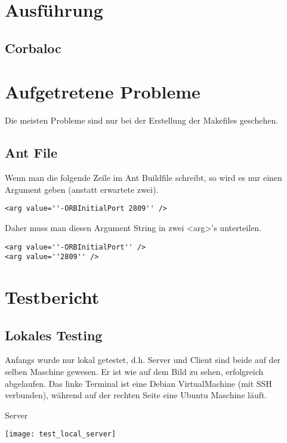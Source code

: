 \documentclass[11pt]{article}
\begin{document}
\section{Ausführung}


\subsection{Corbaloc}
\cite{book1}

\section{Aufgetretene Probleme}
Die meisten Probleme sind nur bei der Erstellung der Makefiles geschehen.
\subsection{Ant File}

Wenn man die folgende Zeile im Ant Buildfile schreibt, so wird es nur einen Argument geben (anstatt erwartete zwei).
\begin{lstlisting}
<arg value=''-ORBInitialPort 2809'' />
\end{lstlisting}

Daher muss man diesen Argument String in zwei <arg>'s unterteilen.
\begin{lstlisting}
<arg value=''-ORBInitialPort'' />
<arg value=''2809'' />
\end{lstlisting}

\section{Testbericht}

\subsection{Lokales Testing}

Anfangs wurde nur lokal getestet, d.h. Server und Client sind beide auf der selben Maschine gewesen. Er ist wie auf dem Bild zu sehen, erfolgreich abgelaufen. Das linke Terminal ist eine Debian VirtualMachine (mit SSH verbunden), während auf der rechten Seite eine Ubuntu Maschine läuft.

Server
\begin{center}
  \texttt{[image: test\_local\_server]}
\end{center}
\end{document}
